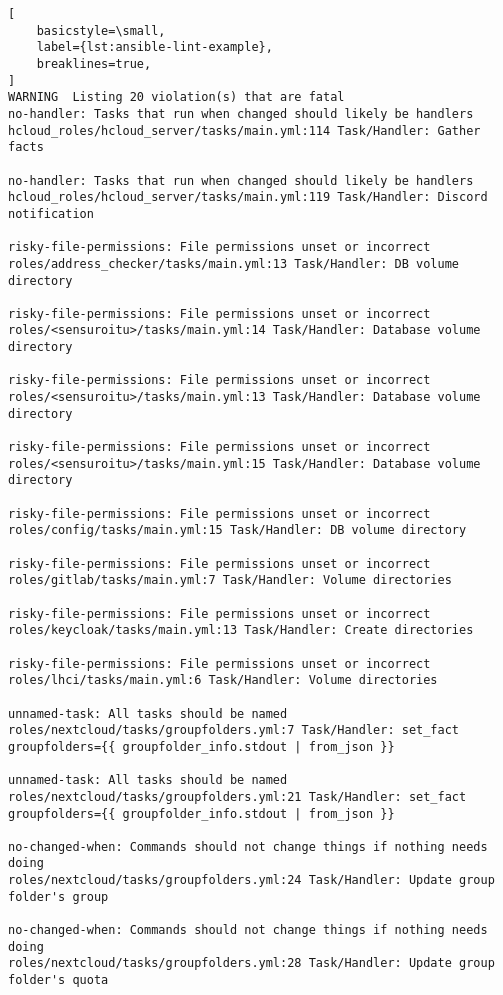 \begin{lstlisting}[
    basicstyle=\small,
    label={lst:ansible-lint-example},
    breaklines=true,
]
WARNING  Listing 20 violation(s) that are fatal
no-handler: Tasks that run when changed should likely be handlers
hcloud_roles/hcloud_server/tasks/main.yml:114 Task/Handler: Gather facts

no-handler: Tasks that run when changed should likely be handlers
hcloud_roles/hcloud_server/tasks/main.yml:119 Task/Handler: Discord notification

risky-file-permissions: File permissions unset or incorrect
roles/address_checker/tasks/main.yml:13 Task/Handler: DB volume directory

risky-file-permissions: File permissions unset or incorrect
roles/<sensuroitu>/tasks/main.yml:14 Task/Handler: Database volume directory

risky-file-permissions: File permissions unset or incorrect
roles/<sensuroitu>/tasks/main.yml:13 Task/Handler: Database volume directory

risky-file-permissions: File permissions unset or incorrect
roles/<sensuroitu>/tasks/main.yml:15 Task/Handler: Database volume directory

risky-file-permissions: File permissions unset or incorrect
roles/config/tasks/main.yml:15 Task/Handler: DB volume directory

risky-file-permissions: File permissions unset or incorrect
roles/gitlab/tasks/main.yml:7 Task/Handler: Volume directories

risky-file-permissions: File permissions unset or incorrect
roles/keycloak/tasks/main.yml:13 Task/Handler: Create directories

risky-file-permissions: File permissions unset or incorrect
roles/lhci/tasks/main.yml:6 Task/Handler: Volume directories

unnamed-task: All tasks should be named
roles/nextcloud/tasks/groupfolders.yml:7 Task/Handler: set_fact groupfolders={{ groupfolder_info.stdout | from_json }}

unnamed-task: All tasks should be named
roles/nextcloud/tasks/groupfolders.yml:21 Task/Handler: set_fact groupfolders={{ groupfolder_info.stdout | from_json }}

no-changed-when: Commands should not change things if nothing needs doing
roles/nextcloud/tasks/groupfolders.yml:24 Task/Handler: Update group folder's group

no-changed-when: Commands should not change things if nothing needs doing
roles/nextcloud/tasks/groupfolders.yml:28 Task/Handler: Update group folder's quota


\end{lstlisting}
